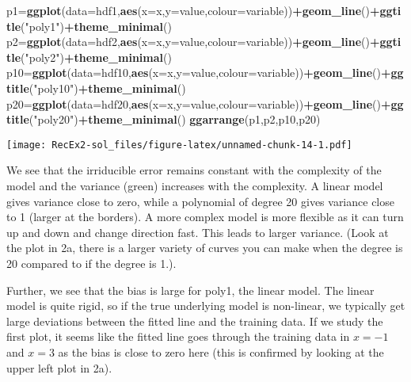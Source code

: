 \documentclass[]{article}
\newenvironment{Shaded}{\begin{snugshade}}{\end{snugshade}}
\newcommand{\DataTypeTok}[1]{\textcolor[rgb]{0.13,0.29,0.53}{#1}}
\newcommand{\KeywordTok}[1]{\textcolor[rgb]{0.13,0.29,0.53}{\textbf{#1}}}
\newcommand{\NormalTok}[1]{#1}
\newcommand{\OperatorTok}[1]{\textcolor[rgb]{0.81,0.36,0.00}{\textbf{#1}}}
\newcommand{\StringTok}[1]{\textcolor[rgb]{0.31,0.60,0.02}{#1}}
\begin{document}
\begin{Shaded}
\begin{Highlighting}[]
\NormalTok{p1=}\KeywordTok{ggplot}\NormalTok{(}\DataTypeTok{data=}\NormalTok{hdf1,}\KeywordTok{aes}\NormalTok{(}\DataTypeTok{x=}\NormalTok{x,}\DataTypeTok{y=}\NormalTok{value,}\DataTypeTok{colour=}\NormalTok{variable))}\OperatorTok{+}\KeywordTok{geom_line}\NormalTok{()}\OperatorTok{+}\KeywordTok{ggtitle}\NormalTok{(}\StringTok{"poly1"}\NormalTok{)}\OperatorTok{+}\KeywordTok{theme_minimal}\NormalTok{()}
\NormalTok{p2=}\KeywordTok{ggplot}\NormalTok{(}\DataTypeTok{data=}\NormalTok{hdf2,}\KeywordTok{aes}\NormalTok{(}\DataTypeTok{x=}\NormalTok{x,}\DataTypeTok{y=}\NormalTok{value,}\DataTypeTok{colour=}\NormalTok{variable))}\OperatorTok{+}\KeywordTok{geom_line}\NormalTok{()}\OperatorTok{+}\KeywordTok{ggtitle}\NormalTok{(}\StringTok{"poly2"}\NormalTok{)}\OperatorTok{+}\KeywordTok{theme_minimal}\NormalTok{()}
\NormalTok{p10=}\KeywordTok{ggplot}\NormalTok{(}\DataTypeTok{data=}\NormalTok{hdf10,}\KeywordTok{aes}\NormalTok{(}\DataTypeTok{x=}\NormalTok{x,}\DataTypeTok{y=}\NormalTok{value,}\DataTypeTok{colour=}\NormalTok{variable))}\OperatorTok{+}\KeywordTok{geom_line}\NormalTok{()}\OperatorTok{+}\KeywordTok{ggtitle}\NormalTok{(}\StringTok{"poly10"}\NormalTok{)}\OperatorTok{+}\KeywordTok{theme_minimal}\NormalTok{()}
\NormalTok{p20=}\KeywordTok{ggplot}\NormalTok{(}\DataTypeTok{data=}\NormalTok{hdf20,}\KeywordTok{aes}\NormalTok{(}\DataTypeTok{x=}\NormalTok{x,}\DataTypeTok{y=}\NormalTok{value,}\DataTypeTok{colour=}\NormalTok{variable))}\OperatorTok{+}\KeywordTok{geom_line}\NormalTok{()}\OperatorTok{+}\KeywordTok{ggtitle}\NormalTok{(}\StringTok{"poly20"}\NormalTok{)}\OperatorTok{+}\KeywordTok{theme_minimal}\NormalTok{()}
\KeywordTok{ggarrange}\NormalTok{(p1,p2,p10,p20)}
\end{Highlighting}
\end{Shaded}

\texttt{[image: RecEx2-sol\_files/figure-latex/unnamed-chunk-14-1.pdf]}

We see that the irriducible error remains constant with the complexity
of the model and the variance (green) increases with the complexity. A
linear model gives variance close to zero, while a polynomial of degree
20 gives variance close to 1 (larger at the borders). A more complex
model is more flexible as it can turn up and down and change direction
fast. This leads to larger variance. (Look at the plot in 2a, there is a
larger variety of curves you can make when the degree is 20 compared to
if the degree is 1.).

Further, we see that the bias is large for poly1, the linear model. The
linear model is quite rigid, so if the true underlying model is
non-linear, we typically get large deviations between the fitted line
and the training data. If we study the first plot, it seems like the
fitted line goes through the training data in \(x=-1\) and \(x=3\) as
the bias is close to zero here (this is confirmed by looking at the
upper left plot in 2a).
\end{document}
